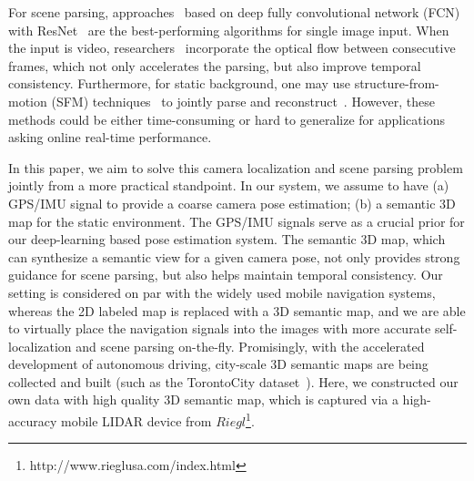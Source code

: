 \documentclass[10pt,twocolumn,letterpaper]{article}
\begin{document}
For scene parsing, approaches~\cite{ZhaoSQWJ16,ChenPSA17} based on deep fully convolutional network (FCN) with ResNet~\cite{HeZRS15} are the best-performing algorithms for single image input. When the input is video, researchers~\cite{kundu2016feature,zhu2016deep} incorporate the optical flow between consecutive frames, which not only accelerates the parsing, but also improve temporal consistency. Furthermore, for static background, one may use structure-from-motion (SFM) techniques~\cite{wu2011visualsfm} to jointly parse and reconstruct~\cite{kundu2014joint}. However, these methods could be either time-consuming or hard to generalize for applications asking online real-time performance.

In this paper, we aim to solve this camera localization and scene parsing problem jointly from a more practical standpoint. In our system, we assume to have (a) GPS/IMU signal to provide a coarse camera pose estimation; (b) a semantic 3D map for the static environment. The GPS/IMU signals serve as a crucial prior for our deep-learning based pose estimation system. The semantic 3D map, which can synthesize a semantic view for a given camera pose, not only provides strong guidance for scene parsing, but also helps maintain temporal consistency.
Our setting is considered on par with the widely used mobile navigation systems, whereas the 2D labeled map is replaced with a 3D semantic map, and we are able to virtually place the navigation signals into the images with more accurate self-localization and scene parsing on-the-fly. 
Promisingly, with the accelerated development of autonomous driving, city-scale 3D semantic maps are being collected and built (such as the TorontoCity dataset~\cite{wang2016torontocity}). Here, we constructed our own data with high quality 3D semantic map, which is captured via a high-accuracy mobile LIDAR device from $Riegl$\footnote{http://www.rieglusa.com/index.html}.
\end{document}
